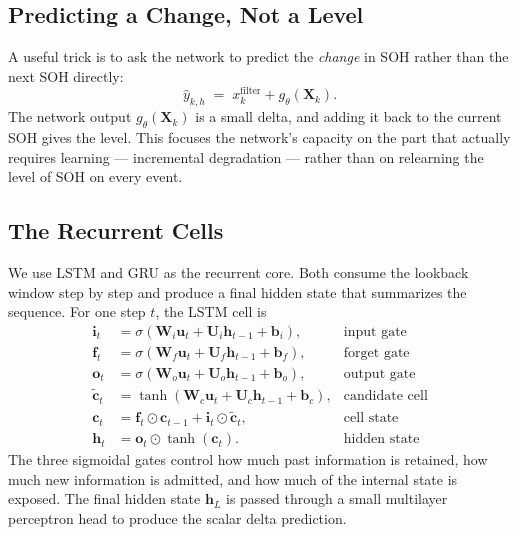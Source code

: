 \documentclass[11pt]{article}
\begin{document}
\subsection{Predicting a Change, Not a Level}

A useful trick is to ask the network to predict the \emph{change} in
SOH rather than the next SOH directly:
\begin{equation}
\widehat{y}_{k,h} \;=\; x^{\mathrm{filter}}_k + g_\theta(\mathbf{X}_k).
\label{eq:delta_pred}
\end{equation}
The network output \(g_\theta(\mathbf{X}_k)\) is a small delta, and
adding it back to the current SOH gives the level. This focuses the
network's capacity on the part that actually requires learning ---
incremental degradation --- rather than on relearning the level of SOH
on every event.

\subsection{The Recurrent Cells}

We use LSTM and GRU as the recurrent core. Both consume the lookback
window step by step and produce a final hidden state that summarizes
the sequence. For one step \(t\), the LSTM cell is
\begin{align}
\mathbf{i}_t &= \sigma(\mathbf{W}_i\mathbf{u}_t + \mathbf{U}_i\mathbf{h}_{t-1} + \mathbf{b}_i),
& \text{input gate} \\
\mathbf{f}_t &= \sigma(\mathbf{W}_f\mathbf{u}_t + \mathbf{U}_f\mathbf{h}_{t-1} + \mathbf{b}_f),
& \text{forget gate} \\
\mathbf{o}_t &= \sigma(\mathbf{W}_o\mathbf{u}_t + \mathbf{U}_o\mathbf{h}_{t-1} + \mathbf{b}_o),
& \text{output gate} \\
\widetilde{\mathbf{c}}_t &= \tanh(\mathbf{W}_c\mathbf{u}_t + \mathbf{U}_c\mathbf{h}_{t-1} + \mathbf{b}_c),
& \text{candidate cell} \\
\mathbf{c}_t &= \mathbf{f}_t \odot \mathbf{c}_{t-1} + \mathbf{i}_t \odot \widetilde{\mathbf{c}}_t,
& \text{cell state} \\
\mathbf{h}_t &= \mathbf{o}_t \odot \tanh(\mathbf{c}_t).
& \text{hidden state}
\end{align}
The three sigmoidal gates control how much past information is
retained, how much new information is admitted, and how much of the
internal state is exposed. The final hidden state \(\mathbf{h}_L\) is
passed through a small multilayer perceptron head to produce the scalar
delta prediction.
\end{document}
